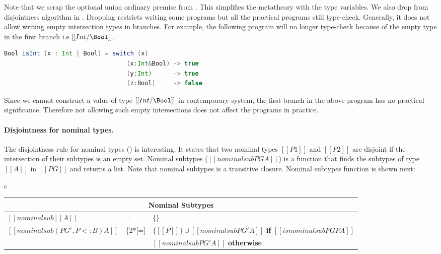 

Note that we scrap the optional union ordinary premise from
. This simplifies
the metatheory with the type variables.
We also drop  from disjointness algorithm
in .
Dropping  restricts writing some
programs but all the practical programs still type-check.
Generally, it does not allow writing empty intersection
types in branches. For example, the following program
will no longer type-check because of the
empty type in the first branch i.e $[[Int/\Bool]]$.

\begin{lstlisting}[language=Scala]
  Bool isInt (x : Int | Bool) = switch (x)
                                  (x:Int&Bool) -> true
                                  (y:Int)      -> true
                                  (z:Bool)     -> false
\end{lstlisting}

\noindent Since we cannot construct a value of type $[[Int/\Bool]]$
in contemporary system, the
first branch in the above program has no practical significance.
Therefore not allowing such empty intersections does not
affect the programs in practice.


\paragraph{Disjointness for nominal types.}
The disjointness rule for nominal types () is interesting.
It states that two nominal types $[[P1]]$ and $[[P2]]$ are disjoint
if the intersection of their subtypes is an empty set.
Nominal subtypes ($[[nominalsub PG A]]$) is a function that
finds the subtypes of type $[[A]]$ in $[[PG]]$ and returns a list.
Note that nominal subtypes is a transitive closure.
Nominal subtypes function is shown next:



\begin{center}
    \begin{tabular}{c}
      {\renewcommand{\arraystretch}{1.5}
       \begin{tabular}{|lll|}
        \multicolumn{3}{c}{Nominal Subtypes \fbox{$[[nominalsub PG A]]$}} \\[0.8mm]
        \hline
        $[[nominalsub [] A]]$ & = & $\{\}$ \\
        \multirow{2}{*}{$[[nominalsub (PG', P <: B) A]]$} & \ldelim\{{2}{*}[=] & $\{[[P]]\} \cup [[nominalsub PG' A]]$ {\textbf{if}} $[[isnominalsub PG P A]]$ \\
                                                               & & $[[nominalsub PG' A]]$ \textbf{otherwise} \\
        \hline
        \end{tabular} }
    \end{tabular}
\end{center}

